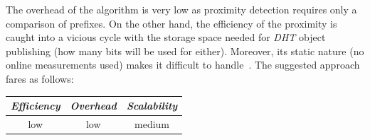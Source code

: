 The overhead of the algorithm is very low as proximity detection requires only
a comparison of prefixes. On the other hand, the efficiency of the proximity
is caught into a vicious cycle with the storage space needed for \emph{DHT} 
object publishing (how many bits will be used for either). 
Moreover, its static nature (no online measurements used) 
makes it difficult to handle~\cite{EWF2011}.
%
%
%
The suggested approach fares as follows:
\begin{center}
{\footnotesize
\begin{tabular}{ccc}
\emph{Efficiency} & \emph{Overhead} & \emph{Scalability} \\
\hline
low &
low &
%
medium
\end{tabular}
}
\end{center}

